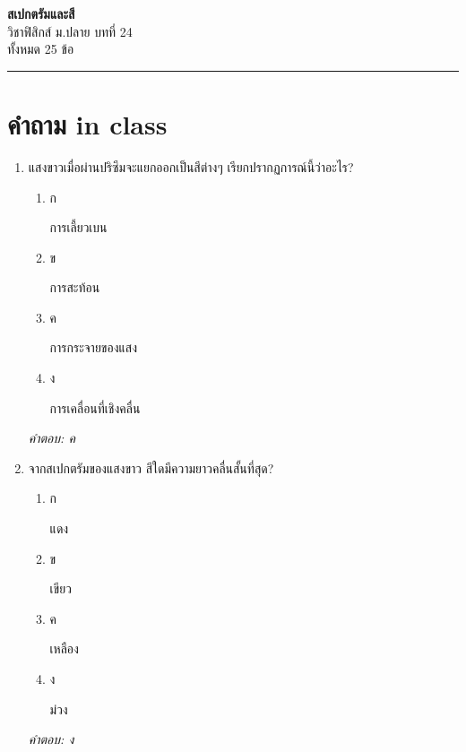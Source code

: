 \documentclass[12pt]{article}
\begin{document}
\begin{center}
{\Large\textbf{สเปกตรัมและสี}}\\[6pt]
{\normalsize วิชาฟิสิกส์ ม.ปลาย บทที่ 24}\\[4pt]
{\footnotesize ทั้งหมด 25 ข้อ}
\end{center}
\hrule
\bigskip

\section*{คำถาม in class}
\begin{enumerate}[label=\arabic*., itemsep=0.5\baselineskip, topsep=0.5\baselineskip, leftmargin=*]
\item แสงขาวเมื่อผ่านปริซึมจะแยกออกเป็นสีต่างๆ เรียกปรากฏการณ์นี้ว่าอะไร?
\begin{enumerate}[label=\alph*)., itemsep=0.3\baselineskip, topsep=0.3\baselineskip]
\item ก\ 
\begin{minipage}[t]{0.9\linewidth}
\raggedright การเลี้ยวเบน
\end{minipage}
\item ข\ 
\begin{minipage}[t]{0.9\linewidth}
\raggedright การสะท้อน
\end{minipage}
\item ค\ 
\begin{minipage}[t]{0.9\linewidth}
\raggedright การกระจายของแสง
\end{minipage}
\item ง\ 
\begin{minipage}[t]{0.9\linewidth}
\raggedright การเคลื่อนที่เชิงคลื่น
\end{minipage}
\end{enumerate}
\vspace{-0.3\baselineskip}
\begin{small}
\textit{คำตอบ: ค}
\end{small}

\item จากสเปกตรัมของแสงขาว สีใดมีความยาวคลื่นสั้นที่สุด?
\begin{enumerate}[label=\alph*)., itemsep=0.3\baselineskip, topsep=0.3\baselineskip]
\item ก\ 
\begin{minipage}[t]{0.9\linewidth}
\raggedright แดง
\end{minipage}
\item ข\ 
\begin{minipage}[t]{0.9\linewidth}
\raggedright เขียว
\end{minipage}
\item ค\ 
\begin{minipage}[t]{0.9\linewidth}
\raggedright เหลือง
\end{minipage}
\item ง\ 
\begin{minipage}[t]{0.9\linewidth}
\raggedright ม่วง
\end{minipage}
\end{enumerate}
\vspace{-0.3\baselineskip}
\begin{small}
\textit{คำตอบ: ง}
\end{small}


\end{enumerate}
\end{document}
